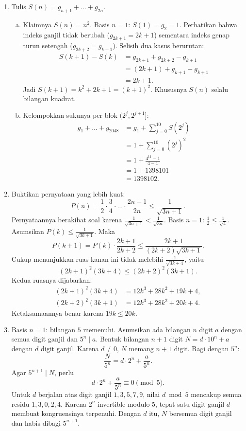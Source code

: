 \documentclass[12pt]{scrartcl}
\begin{document}
\begin{enumerate}
	\item Tulis $S(n) = g_{n+1} + \dots + g_{2n}$.
	\begin{enumerate}[(a)]
		\item Klaimnya $S(n) = n^2$.
		Basis $n = 1$: $S(1) = g_2 = 1$.
		Perhatikan bahwa indeks ganjil tidak berubah ($g_{2k+1} = 2k+1$)
		sementara indeks genap turun setengah ($g_{2k+2} = g_{k+1}$).
		Selisih dua kasus berurutan:
		\begin{align*}
		S(k+1) - S(k) &= g_{2k+1} + g_{2k+2} - g_{k+1} \\
		&= (2k+1) + g_{k+1} - g_{k+1} \\
		&= 2k+1.
		\end{align*}
		Jadi $S(k+1) = k^2 + 2k + 1 = (k+1)^2$.
		Khususnya $S(n)$ selalu bilangan kuadrat.
		\item Kelompokkan sukunya per blok $(2^j, 2^{j+1}]$:
		\begin{align*}
		g_1 + \dots + g_{2048}
		&= g_1 + \sum_{j=0}^{10} S(2^j) \\
		&= 1 + \sum_{j=0}^{10} (2^j)^2 \\
		&= 1 + \frac{4^{11} - 1}{4 - 1} \\
		&= 1 + 1398101 \\
		&= 1398102.
		\end{align*}
	\end{enumerate}

	\item Buktikan pernyataan yang lebih kuat:
	\[ P(n) = \frac{1}{2} \cdot \frac{3}{4} \cdot \dots \cdot \frac{2n-1}{2n}
	\le \frac{1}{\sqrt{3n+1}}. \]
	Pernyataannya berakibat soal karena $\frac{1}{\sqrt{3n+1}} < \frac{1}{\sqrt{3n}}$.
	Basis $n = 1$: $\frac{1}{2} \le \frac{1}{\sqrt{4}}$.
	Asumsikan $P(k) \le \frac{1}{\sqrt{3k+1}}$. Maka
	\[ P(k+1) = P(k) \cdot \frac{2k+1}{2k+2}
	\le \frac{2k+1}{(2k+2)\sqrt{3k+1}}. \]
	Cukup menunjukkan ruas kanan ini tidak melebihi $\frac{1}{\sqrt{3k+4}}$,
	yaitu
	\[ (2k+1)^2(3k+4) \le (2k+2)^2(3k+1). \]
	Kedua ruasnya dijabarkan:
	\begin{align*}
	(2k+1)^2(3k+4) &= 12k^3 + 28k^2 + 19k + 4, \\
	(2k+2)^2(3k+1) &= 12k^3 + 28k^2 + 20k + 4.
	\end{align*}
	Ketaksamaannya benar karena $19k \le 20k$.

	\item Basis $n = 1$: bilangan $5$ memenuhi.
	Asumsikan ada bilangan $n$ digit $a$ dengan semua digit ganjil
	dan $5^n \mid a$.
	Bentuk bilangan $n+1$ digit $N = d \cdot 10^n + a$ dengan $d$ digit ganjil.
	Karena $d \ne 0$, $N$ memang $n+1$ digit.
	Bagi dengan $5^n$:
	\[ \frac{N}{5^n} = d \cdot 2^n + \frac{a}{5^n}. \]
	Agar $5^{n+1} \mid N$, perlu
	\[ d \cdot 2^n + \frac{a}{5^n} \equiv 0 \pmod{5}. \]
	Untuk $d$ berjalan atas digit ganjil $1, 3, 5, 7, 9$,
	nilai $d \bmod 5$ mencakup semua residu $1, 3, 0, 2, 4$.
	Karena $2^n$ invertible modulo $5$, tepat satu digit ganjil $d$
	membuat kongruensinya terpenuhi.
	Dengan $d$ itu, $N$ bersemua digit ganjil dan habis dibagi $5^{n+1}$.


\end{enumerate}
\end{document}
